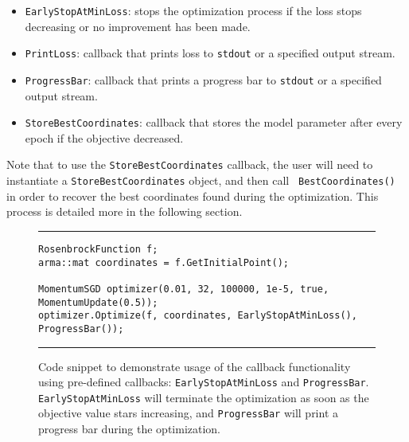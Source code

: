 \begin{itemize}
  \item {\tt EarlyStopAtMinLoss}: stops the optimization process if the loss
stops decreasing or no improvement has been made.

  \item {\tt PrintLoss}: callback that prints loss to {\tt stdout} or a
specified output stream.

  \item {\tt ProgressBar}: callback that prints a progress bar to {\tt stdout}
or a specified output stream.

  \item {\tt StoreBestCoordinates}: callback that stores the model parameter
after every epoch if the objective decreased.
\end{itemize}

Note that to use the {\tt StoreBestCoordinates} callback, the user will need to
instantiate a {\tt StoreBestCoordinates} object, and then call {\tt
BestCoordinates()} in order to recover the best coordinates found during the
optimization.  This process is detailed more in the following section.

\begin{figure}[b!]
\centering
\hrule
\vspace{1ex}
\begin{verbatim}
RosenbrockFunction f;
arma::mat coordinates = f.GetInitialPoint();

MomentumSGD optimizer(0.01, 32, 100000, 1e-5, true, MomentumUpdate(0.5));
optimizer.Optimize(f, coordinates, EarlyStopAtMinLoss(), ProgressBar());
\end{verbatim}
\hrule
\vspace*{-0.5em}
\caption
  {
  Code snippet to demonstrate usage of the callback functionality using
pre-defined callbacks: \texttt{EarlyStopAtMinLoss} and \texttt{ProgressBar}.
{\tt EarlyStopAtMinLoss} will terminate the optimization as soon as the
objective value stars increasing, and {\tt ProgressBar} will print a progress
bar during the optimization.
  }
\label{fig:example_prog_callbacks}
\end{figure}


